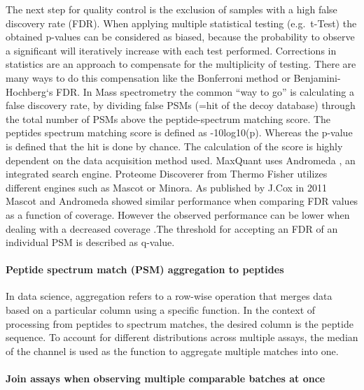 \documentclass[
  11pt,
]{article}
\begin{document}
The next step for quality control is the exclusion of samples with a
high false discovery rate (FDR). When applying multiple statistical
testing (e.g.~t-Test) the obtained p-values can be considered as biased,
because the probability to observe a significant will iteratively
increase with each test performed. Corrections in statistics are an
approach to compensate for the multiplicity of testing. There are many
ways to do this compensation like the Bonferroni method or
Benjamini-Hochberg`s FDR. In Mass spectrometry the common ``way to go''
is calculating a false discovery rate, by dividing false PSMs (=hit of
the decoy database) through the total number of PSMs above the
peptide-spectrum matching score. The peptides spectrum matching score is
defined as -10log10(p). Whereas the p-value is defined that the hit is
done by chance. The calculation of the score is highly dependent on the
data acquisition method used. MaxQuant uses Andromeda , an integrated
search engine. Proteome Discoverer from Thermo Fisher utilizes different
engines such as Mascot or Minora. As published by J.Cox in 2011 Mascot
and Andromeda showed similar performance when comparing FDR values as a
function of coverage. However the observed performance can be lower when
dealing with a decreased coverage \citep{Cox2011}.The threshold for
accepting an FDR of an individual PSM is described as q-value.

\hypertarget{peptide-spectrum-match-psm-aggregation-to-peptides}{%
\paragraph{Peptide spectrum match (PSM) aggregation to
peptides}\label{peptide-spectrum-match-psm-aggregation-to-peptides}}

In data science, aggregation refers to a row-wise operation that merges
data based on a particular column using a specific function. In the
context of processing from peptides to spectrum matches, the desired
column is the peptide sequence. To account for different distributions
across multiple assays, the median of the channel is used as the
function to aggregate multiple matches into one.

\hypertarget{join-assays-when-observing-multiple-comparable-batches-at-once}{%
\paragraph{Join assays when observing multiple comparable batches at
once}\label{join-assays-when-observing-multiple-comparable-batches-at-once}}
\end{document}
